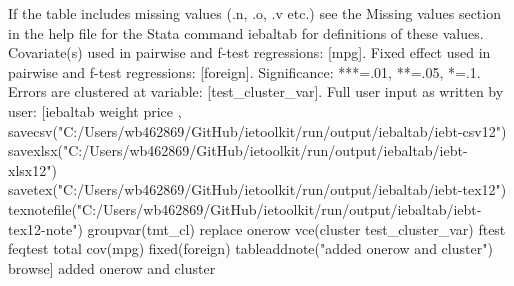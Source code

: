 If the table includes missing values (.n, .o, .v etc.) see the Missing values section in the help file for the Stata command iebaltab for definitions of these values. Covariate(s) used in pairwise and f-test regressions: [mpg]. Fixed effect used in pairwise and f-test regressions: [foreign]. Significance: ***=.01, **=.05, *=.1. Errors are clustered at variable: [test\_cluster\_var]. Full user input as written by user: [iebaltab weight price , savecsv("C:/Users/wb462869/GitHub/ietoolkit/run/output/iebaltab/iebt-csv12") savexlsx("C:/Users/wb462869/GitHub/ietoolkit/run/output/iebaltab/iebt-xlsx12") savetex("C:/Users/wb462869/GitHub/ietoolkit/run/output/iebaltab/iebt-tex12") texnotefile("C:/Users/wb462869/GitHub/ietoolkit/run/output/iebaltab/iebt-tex12-note") groupvar(tmt\_cl) replace onerow vce(cluster test\_cluster\_var) ftest feqtest total cov(mpg) fixed(foreign) tableaddnote("added onerow and cluster") browse] added onerow and cluster
